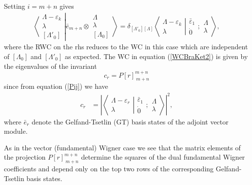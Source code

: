 \documentclass[12pt]{article}
\begin{document}
Setting $i=m+n$ gives
\begin{align}
\left\langle\left. 
\begin{array}{c} \Lambda-\varepsilon_k\\ \lambda \\ {[\Lambda'_0]} \end{array}
\right|\right.
\left.
\bar{e}_{m+n} \otimes \begin{array}{c} \Lambda \\ \lambda \\
{[\Lambda_0]} \end{array}
\right\rangle = \delta_{[\Lambda'_0][\Lambda]}
 \left\langle\left. 
\begin{array}{c} \Lambda-\varepsilon_k\\ \lambda \end{array}
\right|\right.
\left.
\begin{array}{c} 
\bar{\varepsilon}_1 \\ \dot{0}
\end{array}
;
\begin{array}{c} \Lambda \\
\lambda \end{array}
\right\rangle  , \label{WCBraKet2}
\end{align}
where the RWC on the rhs reduces to the WC in this case which are independent of $[\Lambda_0]$ and $[\Lambda'_0]$ as expected. 
The WC in equation (\ref{WCBraKet2}) is given by the eigenvalues of the invariant
$$ 
c_r = P[r]_{\ m+n}^{m+n}
$$
since from equation (\ref{Pij}) we have
\begin{align}
c_r &= \left| \left\langle\left. 
\begin{array}{c} \Lambda-\varepsilon_r\\ \lambda \end{array}
\right|\right.
\left.
\begin{array}{c} \bar{\varepsilon}_1 \\
\dot{0} \end{array}  ; \begin{array}{c} \Lambda \\
\lambda \end{array}
\right\rangle \right|^2, \label{WigCoefCUnbar}
\end{align}
where $\bar{e}_r$ denote the Gelfand-Tsetlin (GT) basis states of the adjoint vector module.

As in the vector (fundamental) Wigner case we see that the matrix elements of the projection  $P[r]_{\ m+n}^{m+n}$ determine
the squares of the dual fundamental Wigner coefficients and depend only on the top two rows of the corresponding Gelfand-Tsetlin basis states.
\end{document}
